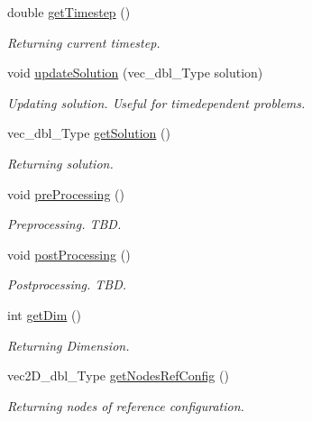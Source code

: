 \begin{DoxyCompactItemize}
double \hyperlink{classFEDD_1_1AssembleFE_ab6cc0ce0c63df078ee4b6d93b93d928d}{get\+Timestep} ()
\begin{DoxyCompactList}\small\item\em Returning current timestep. \end{DoxyCompactList}\item 
void \hyperlink{classFEDD_1_1AssembleFE_a5303adf0752fe27d9ff47ae8a39c1da4}{update\+Solution} (vec\+\_\+dbl\+\_\+\+Type solution)
\begin{DoxyCompactList}\small\item\em Updating solution. Useful for timedependent problems. \end{DoxyCompactList}\item 
vec\+\_\+dbl\+\_\+\+Type \hyperlink{classFEDD_1_1AssembleFE_a33e83a1eb6656a74609dfbfaf3fae474}{get\+Solution} ()
\begin{DoxyCompactList}\small\item\em Returning solution. \end{DoxyCompactList}\item 
\mbox{\label{classFEDD_1_1AssembleFE_a7bfb3f6b49f102b0856551d62c8c8a9f}} 
void \hyperlink{classFEDD_1_1AssembleFE_a7bfb3f6b49f102b0856551d62c8c8a9f}{pre\+Processing} ()
\begin{DoxyCompactList}\small\item\em Preprocessing. T\+BD. \end{DoxyCompactList}\item 
\mbox{\label{classFEDD_1_1AssembleFE_a8ae32f71020082d81b055afbeda6fc29}} 
void \hyperlink{classFEDD_1_1AssembleFE_a8ae32f71020082d81b055afbeda6fc29}{post\+Processing} ()
\begin{DoxyCompactList}\small\item\em Postprocessing. T\+BD. \end{DoxyCompactList}\item 
int \hyperlink{classFEDD_1_1AssembleFE_a35ada89164c74b433340733c01f30f4b}{get\+Dim} ()
\begin{DoxyCompactList}\small\item\em Returning Dimension. \end{DoxyCompactList}\item 
vec2\+D\+\_\+dbl\+\_\+\+Type \hyperlink{classFEDD_1_1AssembleFE_a93f37b5e5f8f9a73152abb2e8be4ba4f}{get\+Nodes\+Ref\+Config} ()
\begin{DoxyCompactList}\small\item\em Returning nodes of reference configuration. \end{DoxyCompactList}\end{DoxyCompactItemize}
